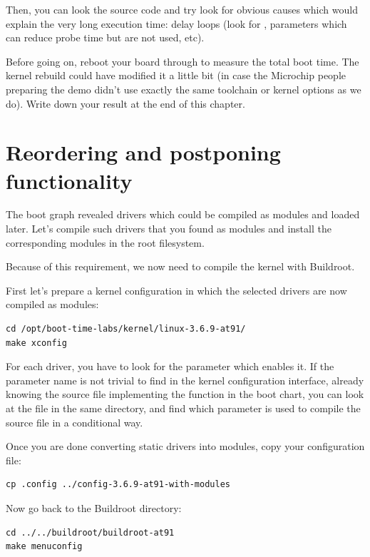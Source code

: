 Then, you can look the source code and try look for obvious causes which
would explain the very long execution time: delay loops (look for
, parameters which can reduce probe time but are not used,
etc).

Before going on, reboot your board through  to measure
the total boot time. The kernel rebuild could have modified it a little
bit (in case the Microchip people preparing the demo didn't use exactly the same toolchain
or kernel options as we do). Write down your result at the end of this
chapter.

\section{Reordering and postponing functionality}

The boot graph revealed drivers which could be compiled as modules
and loaded later.  Let's compile such drivers that you found as modules
and install the corresponding modules in the root filesystem.

Because of this requirement, we now need to compile the kernel with
Buildroot.

First let's prepare a kernel configuration in which the selected
drivers are now compiled as modules:

\begin{verbatim}
cd /opt/boot-time-labs/kernel/linux-3.6.9-at91/
make xconfig
\end{verbatim}

For each driver, you have to look for the parameter which enables it.
If the parameter name is not trivial to find in the kernel configuration
interface, already knowing the source file implementing
the function in the boot chart, you can look at
the  file in the same directory, and find which
parameter is used to compile the source file in a conditional way.

Once you are done converting static drivers into modules,
copy your configuration file:

\begin{verbatim}
cp .config ../config-3.6.9-at91-with-modules
\end{verbatim}

Now go back to the Buildroot directory:

\begin{verbatim}
cd ../../buildroot/buildroot-at91
make menuconfig
\end{verbatim}

